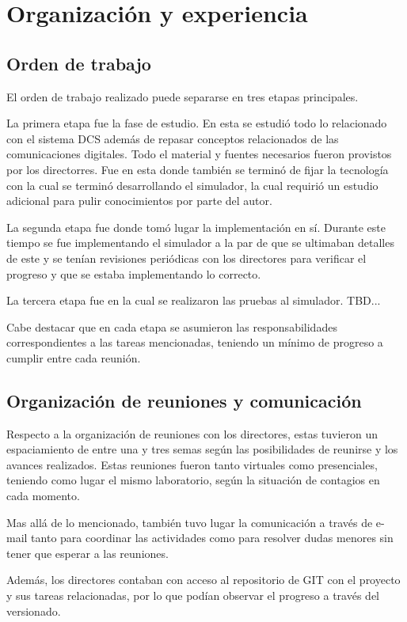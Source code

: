 \documentclass[a4paper,10pt]{article}
\begin{document}
\section{Organización y experiencia}
\subsection{Orden de trabajo}
El orden de trabajo realizado puede separarse en tres etapas principales.
\par
La primera etapa fue la fase de estudio. En esta se estudió todo lo relacionado con el sistema DCS además de repasar conceptos relacionados de las comunicaciones digitales. Todo el material y fuentes necesarios fueron provistos por los directorres. Fue en
esta donde también se terminó de fijar la tecnología con la cual se terminó desarrollando el simulador, la cual requirió un estudio adicional para pulir conocimientos por parte del autor.
\par
La segunda etapa fue donde tomó lugar la implementación en sí. Durante este tiempo se fue implementando el simulador a la par de que se ultimaban detalles de este y se tenían revisiones periódicas con los directores para verificar el progreso y que se
estaba implementando lo correcto.
\par
La tercera etapa fue en la cual se realizaron las pruebas al simulador. TBD...
\par
Cabe destacar que en cada etapa se asumieron las responsabilidades correspondientes a las tareas mencionadas, teniendo un mínimo de progreso a cumplir entre cada reunión.
\subsection{Organización de reuniones y comunicación}
Respecto a la organización de reuniones con los directores, estas tuvieron un espaciamiento de entre una y tres semas según las posibilidades de reunirse y los avances realizados. Estas reuniones fueron tanto virtuales como presenciales, teniendo como lugar el mismo laboratorio, según la situación de contagios en cada momento.
\par
Mas allá de lo mencionado, también tuvo lugar la comunicación a través de e-mail tanto para coordinar las actividades como para resolver dudas menores sin tener que esperar a las reuniones.
\par
Además, los directores contaban con acceso al repositorio de GIT con el proyecto y sus tareas relacionadas, por lo que podían observar el progreso a través del versionado.
\end{document}
